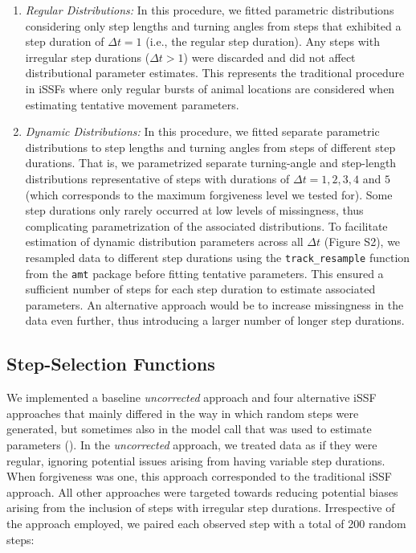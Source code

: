 \documentclass[abstract=on,10pt,a4paper,bibliography=totocnumbered]{article}
\begin{document}
\begin{enumerate}

  \item \textit{Regular Distributions:} In this procedure, we fitted parametric
  distributions considering only step lengths and turning angles from steps that
  exhibited a step duration of $\Delta t = 1$ (i.e., the regular step duration).
  Any steps with irregular step durations ($\Delta t > 1$) were discarded and
  did not affect distributional parameter estimates. This represents the
  traditional procedure in iSSFs where only regular bursts of animal locations
  are considered when estimating tentative movement parameters.

  \item \textit{Dynamic Distributions:} In this procedure, we fitted separate
  parametric distributions to step lengths and turning angles from steps of
  different step durations. That is, we parametrized separate turning-angle and
  step-length distributions representative of steps with durations of $\Delta t
  = 1, 2, 3, 4$ and $5$ (which corresponds to the maximum forgiveness level we
  tested for). Some step durations only rarely occurred at low levels of
  missingness, thus complicating parametrization of the associated
  distributions. To facilitate estimation of dynamic distribution parameters
  across all $\Delta t$ (Figure S2), we resampled data to different step
  durations using the \texttt{track\_resample} function from the \texttt{amt}
  package \citep{Signer.2019} before fitting tentative parameters. This ensured
  a sufficient number of steps for each step duration to estimate associated
  parameters. An alternative approach would be to increase missingness in the
  data even further, thus introducing a larger number of longer step durations.

\end{enumerate}

\subsection{Step-Selection Functions}

We implemented a baseline \textit{uncorrected} approach and four alternative
iSSF approaches that mainly differed in the way in which random steps were
generated, but sometimes also in the model call that was used to estimate
parameters (). In the \textit{uncorrected} approach, we treated
data as if they were regular, ignoring potential issues arising from having
variable step durations. When forgiveness was one, this approach corresponded
to the traditional iSSF approach. All other approaches were targeted towards
reducing potential biases arising from the inclusion of steps with irregular
step durations. Irrespective of the approach employed, we paired each observed
step with a total of 200 random steps:
\end{document}
